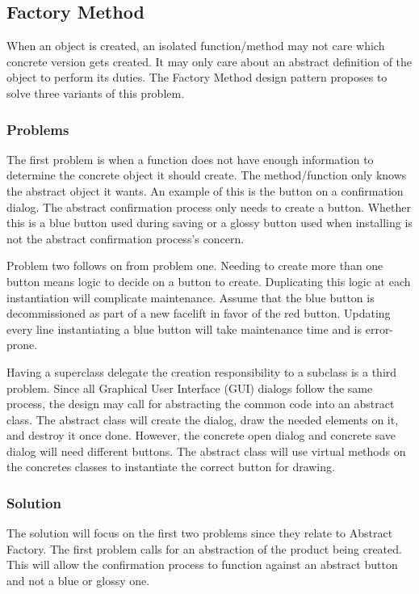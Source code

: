 \subsection{Factory Method}
When an object is created, an isolated function/method may not care which concrete version gets created.
It may only care about an abstract definition of the object to perform its duties.
The Factory Method design pattern proposes to solve three variants of this problem. \cite{gamma_94_01}

\subsubsection{Problems}
The first problem is when a function does not have enough information to determine the concrete object it should create.
The method/function only knows the abstract object it wants.
An example of this is the button on a confirmation dialog.
The abstract confirmation process only needs to create a button.
Whether this is a blue button used during saving or a glossy button used when installing is not the abstract confirmation process's concern.

Problem two follows on from problem one.
Needing to create more than one button means logic to decide on a button to create.
Duplicating this logic at each instantiation will complicate maintenance.
Assume that the blue button is decommissioned as part of a new facelift in favor of the red button.
Updating every line instantiating a blue button will take maintenance time and is error-prone.

Having a superclass delegate the creation responsibility to a subclass is a third problem.
Since all Graphical User Interface (GUI) dialogs follow the same process, the design may call for abstracting the common code into an abstract class.
The abstract class will create the dialog, draw the needed elements on it, and destroy it once done.
However, the concrete open dialog and concrete save dialog will need different buttons.
The abstract class will use virtual methods on the concretes classes to instantiate the correct button for drawing.

\subsubsection{Solution}
The solution will focus on the first two problems since they relate to Abstract Factory.
The first problem calls for an abstraction of the product being created.
This will allow the confirmation process to function against an abstract button and not a blue or glossy one.

